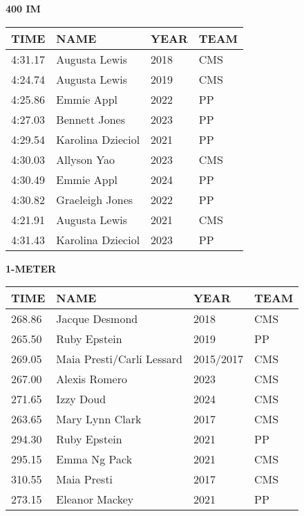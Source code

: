 \vspace{0.4cm}

\begin{center}
\begin{minipage}[t]{0.7\textwidth}
\centering
\textbf{400 IM}\\[0.05cm]
\begin{tabular}{@{}p{1.8cm}p{2.8cm}p{1.2cm}p{1.4cm}@{}}
\hline
\textbf{TIME} & \textbf{NAME} & \textbf{YEAR} & \textbf{TEAM} \\
\hline
4:31.17 & Augusta Lewis & 2018 & CMS \\
4:24.74 & Augusta Lewis & 2019 & CMS \\
4:25.86 & Emmie Appl & 2022 & PP \\
4:27.03 & Bennett Jones & 2023 & PP \\
4:29.54 & Karolina Dzieciol & 2021 & PP \\
4:30.03 & Allyson Yao & 2023 & CMS \\
4:30.49 & Emmie Appl & 2024 & PP \\
4:30.82 & Graeleigh Jones & 2022 & PP \\
4:21.91 & Augusta Lewis & 2021 & CMS \\
4:31.43 & Karolina Dzieciol & 2023 & PP \\
\hline
\end{tabular}
\end{minipage}
\end{center}

\vspace{0.4cm}

\begin{center}
\begin{minipage}[t]{0.7\textwidth}
\centering
\textbf{1-METER}\\[0.05cm]
\begin{tabular}{@{}p{1.8cm}p{2.8cm}p{1.2cm}p{1.4cm}@{}}
\hline
\textbf{TIME} & \textbf{NAME} & \textbf{YEAR} & \textbf{TEAM} \\
\hline
268.86 & Jacque Desmond & 2018 & CMS \\
265.50 & Ruby Epstein & 2019 & PP \\
269.05 & Maia Presti/Carli Lessard & 2015/2017 & CMS \\
267.00 & Alexis Romero & 2023 & CMS \\
271.65 & Izzy Doud & 2024 & CMS \\
263.65 & Mary Lynn Clark & 2017 & CMS \\
294.30 & Ruby Epstein & 2021 & PP \\
295.15 & Emma Ng Pack & 2021 & CMS \\
310.55 & Maia Presti & 2017 & CMS \\
273.15 & Eleanor Mackey & 2021 & PP \\
\hline
\end{tabular}
\end{minipage}
\end{center}

